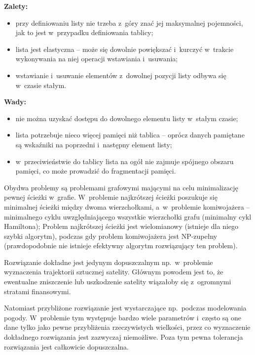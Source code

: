 \medskip
\noindent\textbf{Zalety:}
\begin{itemize}
	\item przy definiowaniu listy nie trzeba z~góry znać jej maksymalnej pojemności, jak to jest w~przypadku definiowania tablicy;
	\item lista jest elastyczna -- może się dowolnie powiększać i~kurczyć w~trakcie wykonywania na niej operacji wstawiania i~usuwania;
	\item wstawianie i~usuwanie elementów z~dowolnej pozycji listy odbywa się w~czasie stałym.
\end{itemize}
\medskip
\noindent\textbf{Wady:}
\begin{itemize}
	\item nie można uzyskać dostępu do dowolnego elementu listy w~stałym czasie;
	\item lista potrzebuje nieco więcej pamięci niż tablica -- oprócz danych pamiętane są wskaźniki na poprzedni i~następny element listy;
	\item w~przeciwieństwie do tablicy lista na ogół nie zajmuje spójnego obszaru pamięci, co może prowadzić do fragmentacji pamięci.
\end{itemize}

\exercise %
Obydwa problemy są problemami grafowymi mającymi na celu minimalizację pewnej ścieżki w~grafie.
W~problemie najkrótszej ścieżki poszukuje się minimalnej ścieżki między dwoma wierzchołkami, a~w~problemie komiwojażera -- minimalnego cyklu uwzględniającego wszystkie wierzchołki grafu (minimalny cykl Hamiltona);
Problem najkrótszej ścieżki jest wielomianowy (istnieje dla niego szybki algorytm), podczas gdy problem komiwojażera jest NP-zupełny (prawdopodobnie nie istnieje efektywny algorytm rozwiązujący ten problem).

\exercise %
Rozwiązanie dokładne jest jedynym dopuszczalnym np.\ w~problemie wyznaczenia trajektorii sztucznej satelity.
Głównym powodem jest to, że ewentualne zniszczenie lub uszkodzenie satelity wiązałoby się z~ogromnymi stratami finansowymi.

Natomiast przybliżone rozwiązanie jest wystarczające np.\ podczas modelowania pogody.
W~problemie tym występuje bardzo wiele parametrów i~często są one dane tylko jako pewne przybliżenia rzeczywistych wielkości, przez co wyznaczenie dokładnego rozwiązania jest zazwyczaj niemożliwe.
Poza tym pewna tolerancja rozwiązania jest całkowicie dopuszczalna.
